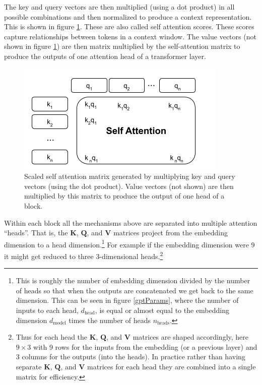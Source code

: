 The key and query vectors are then multiplied (using a dot product) in all possible combinations and then normalized to produce a context representation. This is shown in figure \ref{selfAttention}. These are also called self attention scores. These scores capture relationships between tokens in a context window. The value vectors (not shown in figure \ref{selfAttention}) are then matrix multiplied by the self-attention matrix to produce the outputs of one attention head of a transformer layer.

\begin{figure}[h]
\centering
\includegraphics[scale=.6]{./images/selfAttention.png}
\caption[Jeff Yoshimi with consultation from Tim Meyer.]{Scaled self attention matrix generated by multiplying key and query vectors (using the dot product). Value vectors (not shown) are then multiplied by this matrix to produce the output of one head of a block.}
\label{selfAttention}
\end{figure}

Within each block all the mechanisms above are separated into multiple attention ``heads''.  That is, the $\textbf{K}$, $\textbf{Q}$, and $\textbf{V}$ matrices project from the embedding dimension to a head dimension.\footnote{This is roughly the number of embedding dimension divided by the number of heads so that when the outputs are concatenated we get back to the same dimension. This can be seen in figure \ref{gptParams}, where the number of inputs to each head, $d_\text{head}$, is equal  or almost equal to  the embedding dimension $d_\text{model}$ times the number of heads $n_\text{heads}$.}  For example if the embedding dimension were 9 it might get reduced to three 3-dimensional heads.\footnote{Thus for each head the $\textbf{K}$, $\textbf{Q}$, and $\textbf{V}$ matrices are shaped accordingly, here $9 \times 3$ with 9 rows for the inputs from the embedding (or a previous layer) and 3 columns for the outputs (into the heads). In practice rather than having separate $\textbf{K}$, $\textbf{Q}$, and $\textbf{V}$ matrices for each head they are combined into a single matrix for efficiency.}


